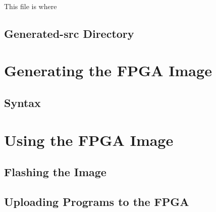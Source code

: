 \subsubsection{}\label{sec:Customizing_FPGA-TestHarness.scala}
This file is where

\subsection{Generated-src Directory}\label{sec:Customizing_FPGA-Generated-src_Directory}

\section{Generating the FPGA Image}\label{sec:Generating_FPGA_Image}
\subsection{Syntax}\label{sec:Generating_FPGA_Image-Syntax}


\section{Using the FPGA Image}\label{sec:Using_FPGA_Image}
\subsection{Flashing the Image}\label{sec:Flash_FPGA_Image}
\subsection{Uploading Programs to the FPGA}\label{sec:Upload_Programs_to_Flashed_FPGA}
